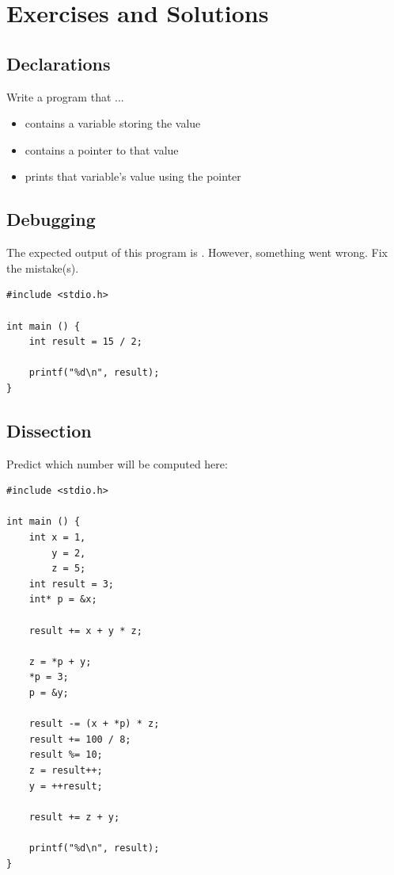 {{{{\newpage
\section{Exercises and Solutions}
\subsection*{Declarations}
Write a program that ...
\begin{itemize}
\item contains a variable storing the value 
\item contains a pointer to that value
\item prints that variable's value using the pointer
\end{itemize}

\subsection*{Debugging}
The expected output of this program is . However, something went wrong. Fix the mistake(s).
\begin{codebox}[exo3-2.c]
\begin{verbatim}
#include <stdio.h>

int main () {
    int result = 15 / 2;
   
    printf("%d\n", result);
}
\end{verbatim}
\end{codebox}

\subsection*{Dissection}
Predict which number will be computed here:
\begin{codebox}[exo3-3.c]
\begin{verbatim}
#include <stdio.h>

int main () {
    int x = 1,
        y = 2,
        z = 5;
    int result = 3;
    int* p = &x;
    
    result += x + y * z;
    
    z = *p + y;
    *p = 3;
    p = &y;
    
    result -= (x + *p) * z;
    result += 100 / 8;
    result %= 10;
    z = result++;
    y = ++result;
    
    result += z + y;
   
    printf("%d\n", result);
}
\end{verbatim}
\end{codebox}

}}}}
